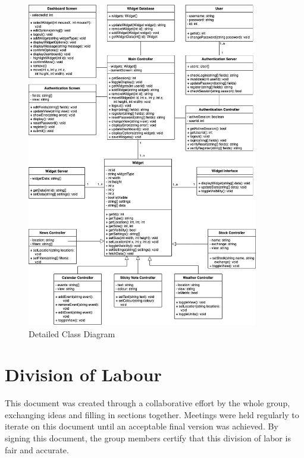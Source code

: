 \documentclass[]{article}
\begin{document}
\begin{figure}[H]
\begin{center}
\includegraphics[width=0.9\textwidth]{D3/images/Class Diagram.png}
\end{center}
\caption{Detailed Class Diagram}
\label{fig:Detailed Class Diagram}
\end{figure}

\appendix
\newpage
\section{Division of Labour}
\label{sec:division_of_labour}
This document was created through a collaborative effort by the whole group, exchanging ideas and filling in sections together. Meetings were held regularly to iterate on this document until an acceptable final version was achieved. By signing this document, the group members certify that this division of labor is fair and accurate.
\end{document}
